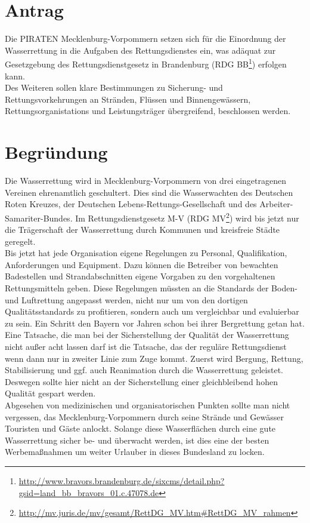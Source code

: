 \section{Antrag}

Die PIRATEN Mecklenburg-Vorpommern setzen sich für die Einordnung der Wasserrettung in die Aufgaben des Rettungsdienstes ein, was adäquat zur Gesetzgebung des Rettungsdienstgesetz in Brandenburg (RDG BB\footnote{\url{http://www.bravors.brandenburg.de/sixcms/detail.php?gsid=land\_bb\_bravors\_01.c.47078.de}}) erfolgen kann.\\Des Weiteren sollen klare Bestimmungen zu Sicherung- und Rettungsvorkehrungen an Stränden, Flüssen und Binnengewässern, Rettungsorganistations und Leistungsträger übergreifend, beschlossen werden.

\section{Begründung}

Die Wasserrettung wird in Mecklenburg-Vorpommern von drei eingetragenen Vereinen ehrenamtlich geschultert. Dies sind die Wasserwachten des Deutschen Roten Kreuzes, der Deutschen Lebens-Rettungs-Gesellschaft und des Arbeiter-Samariter-Bundes. Im Rettungsdienstgesetz M-V (RDG MV\footnote{\url{http://mv.juris.de/mv/gesamt/RettDG\_MV.htm\#RettDG\_MV\_rahmen}}) wird bis jetzt nur die Trägerschaft der Wasserrettung durch Kommunen und kreisfreie Städte geregelt.\\Bis jetzt hat jede Organisation eigene Regelungen zu Personal, Qualifikation, Anforderungen und Equipment. Dazu können die Betreiber von bewachten Badestellen und Strandabschnitten eigene Vorgaben zu den vorgehaltenen Rettungsmitteln geben. Diese Regelungen müssten an die Standards der Boden- und Luftrettung angepasst werden, nicht nur um von den dortigen Qualitätsstandards zu profitieren, sondern auch um vergleichbar und evaluierbar zu sein. Ein Schritt den Bayern vor Jahren schon bei ihrer Bergrettung getan hat.\\Eine Tatsache, die man bei der Sicherstellung der Qualität der Wasserrettung nicht außer acht lassen darf ist die Tatsache, das der reguläre Rettungsdienst wenn dann nur in zweiter Linie zum Zuge kommt. Zuerst wird Bergung, Rettung, Stabilisierung und ggf. auch Reanimation durch die Wasserrettung geleistet. Deswegen sollte hier nicht an der Sicherstellung einer gleichbleibend hohen Qualität gespart werden.\\Abgesehen von medizinischen und organisatorischen Punkten sollte man nicht vergessen, das Mecklenburg-Vorpommern durch seine Strände und Gewässer Touristen und Gäste anlockt. Solange diese Wasserflächen durch eine gute Wasserrettung sicher be- und überwacht werden, ist dies eine der besten Werbemaßnahmen um weiter Urlauber in dieses Bundesland zu locken.
